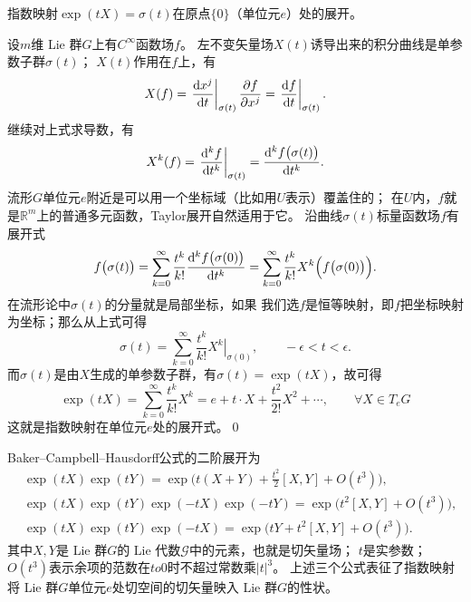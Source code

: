 \begin{example}
    指数映射$\exp(t X)= \sigma(t)$在原点$\{0\}$（单位元$e$）处的展开。
\end{example}
设$m$维 Lie 群$G$上有$C^\infty$函数场$f$。
左不变矢量场$X(t)$诱导出来的积分曲线是单参数子群$\sigma(t)$；
$X(t)$作用在$f$上，有
\begin{equation}
    X(f) = \left.\frac{\dd x^j}{\dd t}\right|_{\sigma(t)}
     \frac{\partial f}{\partial x^j}
     = \left.\frac{\dd f}{\dd t}\right|_{\sigma(t)} .
\end{equation}
继续对上式求导数，有
\begin{equation}
    X^k(f) = \left.\frac{\dd ^k f}{\dd t^k}\right|_{\sigma(t)}
      = \frac{\dd ^k f\bigl(\sigma(t)\bigr)}{\dd t^k}.
\end{equation}
流形$G$单位元$e$附近是可以用一个坐标域（比如用$U$表示）覆盖住的；
在$U$内，$f$就是$\mathbb{R}^m$上的普通多元函数，Taylor展开自然适用于它。
沿曲线$\sigma(t)$标量函数场$f$有展开式
\begin{equation}
    f\bigl(\sigma(t)\bigr) = \sum_{k=0}^{\infty}  \frac{t^k}{k!}
    \frac{\dd ^k f\bigl(\sigma(0)\bigr)}{\dd t^k}
    =\sum_{k=0}^{\infty}  \frac{t^k}{k!}   X^k \Bigl(f\bigl(\sigma(0)\bigr)\Bigr).
\end{equation}
在流形论中$\sigma(t)$的分量就是局部坐标，如果
我们选$f$是恒等映射，即$f$把坐标映射为坐标；那么从上式可得
\begin{equation}
    \sigma(t) = \sum_{k=0}^{\infty} \frac{t^k}{k!} \left. X^k\right|_{\sigma(0)},
    \qquad -\epsilon < t <\epsilon .
\end{equation}
而$\sigma(t)$是由$X$生成的单参数子群，有$\sigma(t)= \exp(tX)$，故可得
\begin{equation}\label{chlg:eqn_exp-pand}
    \exp(t X) = \sum_{k=0}^{\infty} \frac{t^k}{k!} X^k = e + t\cdot X
      + \frac{t^2}{2!} X^2 + \cdots, \qquad \forall X\in T_e G
\end{equation}
这就是指数映射在单位元$e$处的展开式。\qed

Baker--Campbell--Hausdorff公式的二阶展开为
\begin{align}
    &\exp(tX) \exp(tY) = \exp\bigl(t(X+Y)+\frac{t^2}{2} [X,Y]+O(t^3)\bigr),  \\
    &\exp(tX) \exp(tY) \exp(-tX) \exp(-tY) =  \exp\bigl(t^2[X,Y]+O(t^3)\bigr),  \\
    &\exp(tX) \exp(tY) \exp(-tX) =  \exp\bigl(tY+t^2[X,Y]+O(t^3)\bigr) . \label{chlg:eqn_BCH-xy-x}
\end{align}
其中$X,Y$是 Lie 群$G$的 Lie 代数$\mathscr{G}$中的元素，也就是切矢量场；
$t$是实参数；$O(t^3)$表示余项的范数在$t	o0$时不超过常数乘$|t|^3$。
上述三个公式表征了指数映射将 Lie 群$G$单位元$e$处切空间的切矢量映入 Lie 群$G$的性状。

